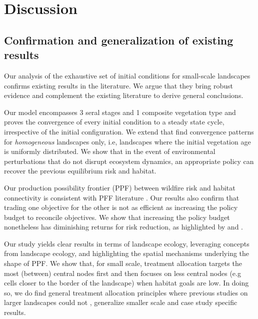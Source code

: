 \section{Discussion}
\label{section:discussion}

\subsection{Confirmation and generalization of existing results}
Our analysis of the exhaustive set of initial conditions for small-scale landscapes confirms existing results in the literature. We argue that they bring robust evidence and complement the existing literature to derive general conclusions. 

Our model encompasses 3 seral stages and 1 composite vegetation type and proves the convergence of every initial condition to a steady state cycle, irrespective of the initial configuration. We extend \cite{minas_spatial_2014} that find convergence patterns for \textit{homogeneous} landscapes only, i.e, landscapes where the initial vegetation age is uniformly distributed.  We show that in the event of environmental perturbations that do not disrupt ecosystem dynamics, an appropriate policy can recover the previous equilibrium risk and habitat. 

Our production possibility frontier (PPF) between wildfire risk and habitat connectivity is consistent with PFF literature \citep{arthaud_methodology_1996,calkin_modeling_2005}. Our results also confirm that trading one objective for the other is not as efficient as increasing the policy budget to reconcile objectives. We show that increasing the policy budget nonetheless has diminishing returns for risk reduction, as highlighted by \cite{wei_optimization_2008, yemshanov_detecting_2021} and \cite{pais_cell2fire_2021}. 

Our study yields clear results in terms of landscape ecology, leveraging concepts from landscape ecology, and highlighting the spatial mechanisms underlying the shape of PPF. We show that, for small scale, treatment allocation targets the most (between) central nodes first and then focuses on less central nodes (e.g cells closer to the border of the landscape) when habitat goals are low. In doing so, we do find general treatment allocation principles where previous studies on larger landscapes could not \citep{minas_spatial_2014, rachmawati_optimisation_2016}, generalize smaller scale \citep{konoshima_spatial-endogenous_2008} and case study specific \citep{yemshanov_detecting_2021, pais_downstream_2021} results.


